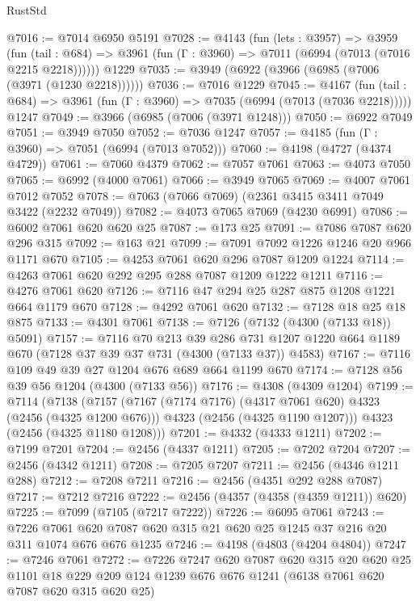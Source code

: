 \begin{lexlean}{RustStd}
\begin{coremodule}
@7016 := @7014 @6950 @5191
@7028 := @4143
    (fun (lets : @3957) =>
    @3959
      (fun (tail : @684) => @3961 (fun (Γ : @3960) => @7011 (@6994 (@7013 (@7016 @2215 @2218))))))
    @1229
@7035 := @3949 (@6922 (@3966 (@6985 (@7006 (@3971 (@1230 @2218))))))
@7036 := @7016 @1229
@7045 := @4167
    (fun (tail : @684) => @3961 (fun (Γ : @3960) => @7035 (@6994 (@7013 (@7036 @2218)))))
    @1247
@7049 := @3966 (@6985 (@7006 (@3971 @1248)))
@7050 := @6922 @7049
@7051 := @3949 @7050
@7052 := @7036 @1247
@7057 := @4185 (fun (Γ : @3960) => @7051 (@6994 (@7013 @7052)))
@7060 := @4198 (@4727 (@4374 @4729))
@7061 := @7060 @4379
@7062 := @7057 @7061
@7063 := @4073 @7050
@7065 := @6992 (@4000 @7061)
@7066 := @3949 @7065
@7069 := @4007 @7061 @7012 @7052
@7078 := @7063 (@7066 @7069) (@2361 @3415 @3411 @7049 @3422 (@2232 @7049))
@7082 := @4073 @7065 @7069 (@4230 @6991)
@7086 := @6002 @7061 @620 @620 @25
@7087 := @173 @25
@7091 := @7086 @7087 @620 @296 @315
@7092 := @163 @21
@7099 := @7091 @7092 @1226 @1246 @20 @966 @1171 @670
@7105 := @4253 @7061 @620 @296 @7087 @1209 @1224
@7114 := @4263 @7061 @620 @292 @295 @288 @7087 @1209 @1222 @1211
@7116 := @4276 @7061 @620
@7126 := @7116 @47 @294 @25 @287 @875 @1208 @1221 @664 @1179 @670
@7128 := @4292 @7061 @620
@7132 := @7128 @18 @25 @18 @875
@7133 := @4301 @7061
@7138 := @7126 (@7132 (@4300 (@7133 @18)) @5091)
@7157 := @7116
    @70
    @213
    @39
    @286
    @731
    @1207
    @1220
    @664
    @1189
    @670
    (@7128 @37 @39 @37 @731 (@4300 (@7133 @37)) @4583)
@7167 := @7116 @109 @49 @39 @27 @1204 @676 @689 @664 @1199 @670
@7174 := @7128 @56 @39 @56 @1204 (@4300 (@7133 @56))
@7176 := @4308 (@4309 @1204)
@7199 := @7114
    (@7138
      (@7157
        (@7167 (@7174 @7176) (@4317 @7061 @620) @4323 (@2456 (@4325 @1200 @676)))
        @4323
        (@2456 (@4325 @1190 @1207)))
      @4323
      (@2456 (@4325 @1180 @1208)))
@7201 := @4332 (@4333 @1211)
@7202 := @7199 @7201
@7204 := @2456 (@4337 @1211)
@7205 := @7202 @7204
@7207 := @2456 (@4342 @1211)
@7208 := @7205 @7207
@7211 := @2456 (@4346 @1211 @288)
@7212 := @7208 @7211
@7216 := @2456 (@4351 @292 @288 @7087)
@7217 := @7212 @7216
@7222 := @2456 (@4357 (@4358 (@4359 @1211)) @620)
@7225 := @7099 (@7105 (@7217 @7222))
@7226 := @6095 @7061
@7243 := @7226 @7061 @620 @7087 @620 @315 @21 @620 @25 @1245 @37 @216 @20 @311 @1074 @676 @676 @1235
@7246 := @4198 (@4803 (@4204 @4804))
@7247 := @7246 @7061
@7272 := @7226
    @7247
    @620
    @7087
    @620
    @315
    @20
    @620
    @25
    @1101
    @18
    @229
    @209
    @124
    @1239
    @676
    @676
    @1241
    (@6138 @7061 @620 @7087 @620 @315 @620 @25)

\end{coremodule}
\end{lexlean}
